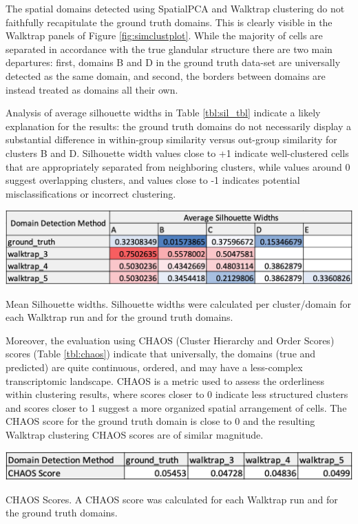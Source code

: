 \documentclass{article}
\begin{document}
The spatial domains detected using SpatialPCA and Walktrap clustering do not faithfully recapitulate the ground truth domains. This is clearly visible in the Walktrap panels of Figure \ref{fig:simclustplot}. While the majority of cells are separated in accordance with the true glandular structure there are two main departures: first, domains B and D in the ground truth data-set are universally detected as the same domain, and second, the borders between domains are instead treated as domains all their own. 

Analysis of average silhouette widths in Table \ref{tbl:sil_tbl} indicate a likely explanation for the results: the ground truth domains do not necessarily display a substantial difference in within-group similarity versus out-group similarity for clusters B and D. Silhouette width values close to +1 indicate well-clustered cells that are appropriately separated from neighboring clusters, while values around 0 suggest overlapping clusters, and values close to -1 indicates potential misclassifications or incorrect clustering.

\begin{table}[h!]
    \includegraphics[width=\textwidth]{images/silhouette.png}
    \caption{Mean Silhouette widths. Silhouette widths were calculated per cluster/domain for each Walktrap run and for the ground truth domains.}
    \label{tbl:sil_tbl}
\end{table}

Moreover, the evaluation using CHAOS (Cluster Hierarchy and Order Scores) scores (Table \ref{tbl:chaos}) indicate that universally, the domains (true and predicted) are quite continuous, ordered, and may have a less-complex transcriptomic landscape. CHAOS is a metric used to assess the orderliness within clustering results, where scores closer to 0 indicate less structured clusters and scores closer to 1 suggest a more organized spatial arrangement of cells. The CHAOS score for the ground truth domain is close to 0 and the resulting Walktrap clustering CHAOS scores are of similar magnitude. 

\begin{table}[h!]
    \includegraphics[width=\textwidth]{images/chaos.png}
    \caption{CHAOS Scores. A CHAOS score was calculated for each Walktrap run and for the ground truth domains.}
    \label{tbl:chaos}
\end{table}
\end{document}
